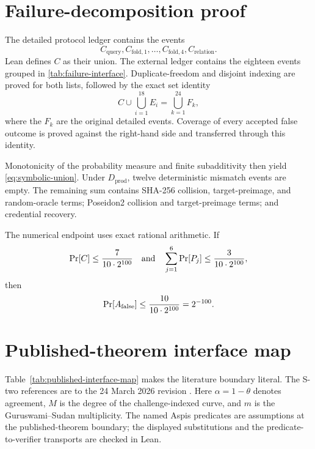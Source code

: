 \section{Failure-decomposition proof}
\label{app:failure-proof}

The detailed protocol ledger contains the events
\[
  C_{\mathrm{query}},
  C_{\mathrm{fold},1},\ldots,C_{\mathrm{fold},4},
  C_{\mathrm{relation}}.
\]
Lean defines \(C\) as their union.  The external ledger contains the eighteen
events grouped in \cref{tab:failure-interface}.  Duplicate-freedom and
disjoint indexing are proved for both lists, followed by the exact set
identity
\[
  C\cup\bigcup_{i=1}^{18}E_i
  =\bigcup_{k=1}^{24}F_k,
\]
where the \(F_k\) are the original detailed events.  Coverage of every
accepted false outcome is proved against the right-hand side and transferred
through this identity.

Monotonicity of the probability measure and finite subadditivity then yield
\cref{eq:symbolic-union}.  Under \(D_{\mathrm{prod}}\), twelve deterministic
mismatch events are empty.  The remaining sum contains SHA-256 collision,
target-preimage, and random-oracle terms; Poseidon2 collision and
target-preimage terms; and credential recovery.

The numerical endpoint uses exact rational arithmetic.  If
\[
  \Pr[C]\leq\frac{7}{10\cdot2^{100}}
  \quad\text{and}\quad
  \sum_{j=1}^{6}\Pr[P_j]\leq\frac{3}{10\cdot2^{100}},
\]
then
\[
  \Pr[A_{\mathrm{false}}]
  \leq\frac{10}{10\cdot2^{100}}=2^{-100}.
\]

\section{Published-theorem interface map}
\label{app:published-interface-map}

Table~\ref{tab:published-interface-map} makes the literature boundary
literal.  The S-two references are to the 24 March 2026 revision
\cite{CarmonEtAl2026Stwo}.  Here \(\alpha=1-\theta\) denotes agreement,
\(M\) is the degree of the challenge-indexed curve, and \(m\) is the
Guruswami--Sudan multiplicity.  The named Aspis predicates are assumptions at
the published-theorem boundary; the displayed substitutions and the
predicate-to-verifier transports are checked in Lean.

